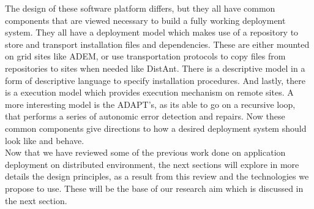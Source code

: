 \documentclass [titlepage,11pt]{article}
\begin{document}
The design of these software platform differs, but they all have common components that are viewed necessary to build a fully working deployment system. They all have a deployment model which makes use of a repository to store and transport installation files and dependencies. These are either mounted on grid sites like ADEM, or use transportation protocols to copy files from repositories to sites when needed like DistAnt. There is a descriptive model in a form of descriptive language to specify installation procedures. And lastly, there is a execution model which provides execution mechanism on remote sites. A more interesting model is the ADAPT's, as its able to go on a recursive loop, that performs a series of autonomic error detection and repairs. Now these common components give directions to how a desired deployment system should look like and behave. \\

Now that we have reviewed some of the previous work done on application deployment on distributed environment, the next sections will explore in more details the design principles, as a result from this review and the technologies we propose to use. These will be the base of our research aim which is discussed in the next section.


\end{document}
